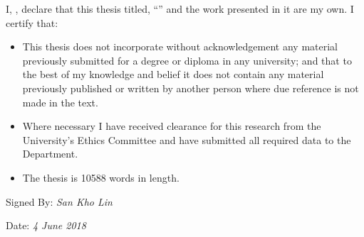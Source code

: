 \documentclass[
11pt, %
oneside, %
english, %
singlespacing, %
headsepline, %
chapterinoneline, %
consistentlayout, %
]{MastersDoctoralThesis} %
\begin{document}

\begin{declaration}
\addchaptertocentry{\authorshipname} %
\bigskip\noindent\ignorespaces

\noindent I, \authorname, declare that this thesis titled, \enquote{\ttitle} and the work presented in it are my own. I certify that:

\begin{itemize} 
\item This thesis does not incorporate without acknowledgement any material previously submitted for a degree or diploma in any university; and that to the best of my knowledge and belief it does not contain any material previously published or written by another person where due reference is not made in the text.
\item Where necessary I have received clearance for this research from the University's Ethics Committee and have submitted all required data to the Department.
\item The thesis is 10588 words in length.\\ %
\end{itemize}
 
\noindent Signed By:  \textit{San Kho Lin}
 
\noindent Date: \textit{4 June 2018}
\end{declaration}

\cleardoublepage




\end{document}
